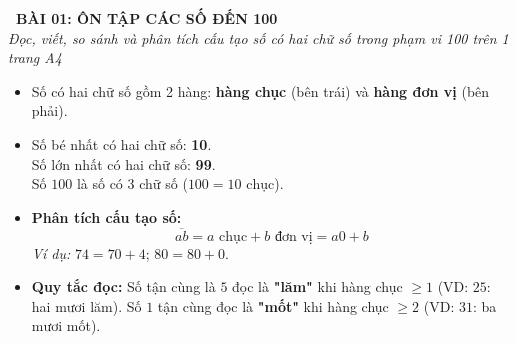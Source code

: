 \documentclass[11pt,a4paper]{article}
\begin{document}
\begin{tcolorbox}[
  enhanced,
  colback=violet!8!white,
  colframe=violet!70!black,
  arc=3mm, boxrule=1.2pt,
  left=3mm, right=3mm, top=2mm, bottom=2mm,
  halign=center
]
  {\LARGE\bfseries\color{violet!90!black}\faBookmark\ BÀI 01: ÔN TẬP CÁC SỐ ĐẾN 100}\\[1mm]
  {\itshape\footnotesize\color{black!75} Đọc, viết, so sánh và phân tích cấu tạo số có hai chữ số trong phạm vi 100 trên 1 trang A4}
\end{tcolorbox}

\vspace{-2mm}

\noindent
\begin{minipage}[t]{0.49\textwidth}\vspace{0pt}
\begin{tcolorbox}[
  enhanced,
  colback=violet!4!white,
  colframe=violet!75!black,
  arc=2mm, boxrule=0.8pt,
  left=2mm, right=2mm, top=1.8mm, bottom=1.8mm,
  title={\footnotesize\bfseries\color{white}\faKey\ 1. Cấu tạo số có hai chữ số}
]
{\footnotesize
\begin{itemize}\setlength{\itemsep}{1pt}\setlength{\leftskip}{-2.5mm}
  \item Số có hai chữ số gồm 2 hàng: \textbf{hàng chục} (bên trái) và \textbf{hàng đơn vị} (bên phải).
  \item Số bé nhất có hai chữ số: \textbf{10}.\\
        Số lớn nhất có hai chữ số: \textbf{99}.\\
        Số $100$ là số có 3 chữ số ($100 = 10\text{ chục}$).
  \item \textbf{Phân tích cấu tạo số:}
  $$\overline{ab} = a\text{ chục} + b\text{ đơn vị} = a0 + b$$
  \textit{Ví dụ:} $74 = 70 + 4$; $80 = 80 + 0$.
  \item \textbf{Quy tắc đọc:} Số tận cùng là $5$ đọc là \textbf{"lăm"} khi hàng chục $\ge 1$ (VD: $25$: hai mươi lăm). Số $1$ tận cùng đọc là \textbf{"mốt"} khi hàng chục $\ge 2$ (VD: $31$: ba mươi mốt).
\end{itemize}
}
\end{tcolorbox}
\end{minipage}
\hfill
\end{document}
